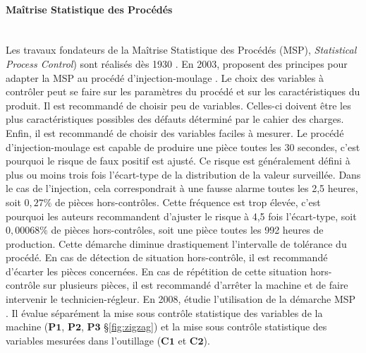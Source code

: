 \paragraph{Maîtrise Statistique des Procédés}\mbox{} \label{parag:spc} \\
Les travaux fondateurs de la Maîtrise Statistique des Procédés (MSP), \textit{Statistical Process Control}) sont réalisés dès 1930 \cite{shewhart_economic_1930, shewhart_economic_1931}.
En 2003, \citeauthor{pillet_maitrise_2003} proposent des principes pour adapter la MSP au procédé d'injection-moulage \cite{pillet_maitrise_2003}.
Le choix des variables à contrôler peut se faire sur les paramètres du procédé et sur les caractéristiques du produit.
Il est recommandé de choisir peu de variables. Celles-ci doivent être les plus caractéristiques possibles des défauts déterminé par le cahier des charges.
Enfin, il est recommandé de choisir des variables faciles à mesurer.
Le procédé d'injection-moulage est capable de produire une pièce toutes les 30 secondes, c'est pourquoi le risque de faux positif est ajusté.
Ce risque est généralement défini à plus ou moins trois fois l'écart-type de la distribution de la valeur surveillée.
Dans le cas de l'injection, cela correspondrait à une fausse alarme toutes les 2,5 heures, soit $0,27\%$ de pièces hors-contrôles.
Cette fréquence est trop élevée, c'est pourquoi les auteurs recommandent d'ajuster le risque à 4,5 fois l'écart-type, soit $0,00068\%$ de pièces hors-contrôles, soit une pièce toutes les 992 heures de production.
Cette démarche diminue drastiquement l'intervalle de tolérance du procédé.
En cas de détection de situation hors-contrôle, il est recommandé d'écarter les pièces concernées.
En cas de répétition de cette situation hors-contrôle sur plusieurs pièces, il est recommandé d'arrêter la machine et de faire intervenir le technicien-régleur.
En 2008, \citeauthor{kazmer_comparison_2008} étudie l'utilisation de la démarche MSP \cite{kazmer_comparison_2008}.
Il évalue séparément la mise sous contrôle statistique des variables de la machine ($\boldsymbol{P1}$, $\boldsymbol{P2}$, $\boldsymbol{P3}$ §\ref{fig:zigzag}) et la mise sous contrôle statistique des variables mesurées dans l'outillage ($\boldsymbol{C1}$ et $\boldsymbol{C2}$).

